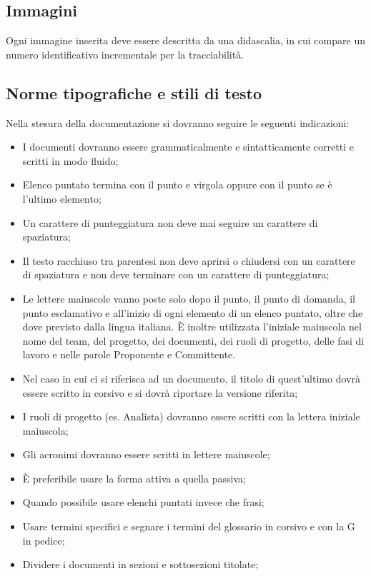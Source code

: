 \subsection{Immagini}
Ogni immagine inserita deve essere descritta da una didascalia, in cui compare un numero identificativo incrementale per la tracciabilità.

\subsection{Norme tipografiche e stili di testo}
\label{5.4}
Nella stesura della documentazione si dovranno seguire le seguenti indicazioni:
\begin{itemize}
\item I documenti dovranno essere grammaticalmente e sintatticamente corretti e scritti in modo fluido;
\item Elenco puntato termina con il punto e virgola oppure con il punto se è l'ultimo elemento;
\item Un carattere di punteggiatura non deve mai seguire un carattere di spaziatura;
\item Il testo racchiuso tra parentesi non deve aprirsi o chiudersi con un carattere di spaziatura e non deve terminare con un carattere di punteggiatura;
\item Le lettere maiuscole vanno poste solo dopo il punto, il punto di domanda, il punto esclamativo e all'inizio di ogni elemento di un elenco puntato, oltre che dove previsto dalla lingua italiana. È inoltre utilizzata l'iniziale maiuscola nel nome del team, del progetto, dei documenti, dei ruoli di progetto, delle fasi di lavoro e nelle parole Proponente e Committente.
\item Nel caso in cui ci si riferisca ad un documento, il titolo di quest'ultimo dovrà essere scritto in corsivo e si dovrà riportare la versione riferita;
\item I ruoli di progetto (es. Analista) dovranno essere scritti con la lettera iniziale maiuscola;
\item Gli acronimi dovranno essere scritti in lettere maiuscole;
\item \`{E} preferibile usare la forma attiva a quella passiva;
\item Quando possibile usare elenchi puntati invece che frasi;
\item Usare termini specifici e segnare i termini del glossario in corsivo e con la G in pedice;
\item Dividere i documenti in sezioni e sottosezioni titolate;

\end{itemize}

